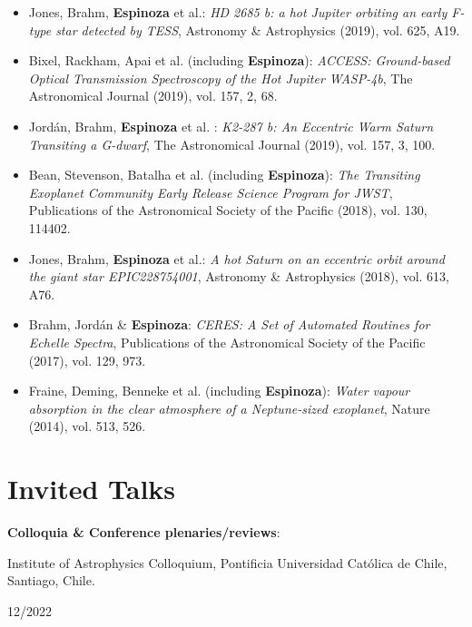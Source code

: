 \documentclass[12pt, a4paper]{article} %
\begin{document}
\begin{flushleft}
\begin{itemize}
\item Jones, Brahm, \textbf{Espinoza} et al.: \textit{HD 2685 b: a hot Jupiter orbiting an early F-type star detected by TESS}, Astronomy \& Astrophysics (2019), vol. 625, A19.
\item Bixel, Rackham, Apai et al. (including \textbf{Espinoza}): \textit{ACCESS: Ground-based Optical Transmission Spectroscopy of the Hot Jupiter WASP-4b}, The Astronomical Journal (2019), vol. 157, 2, 68.
\item Jord\'an, Brahm, \textbf{Espinoza} et al. : \textit{K2-287 b: An Eccentric Warm Saturn Transiting a G-dwarf}, The Astronomical Journal (2019), vol. 157, 3, 100.
\item Bean, Stevenson, Batalha et al. (including \textbf{Espinoza}): \textit{The Transiting Exoplanet Community Early Release Science Program for JWST}, Publications of the Astronomical Society of the Pacific (2018), vol. 130, 114402.
\item Jones, Brahm, \textbf{Espinoza} et al.: \textit{A hot Saturn on an eccentric orbit around the giant star EPIC228754001},  Astronomy \& Astrophysics (2018), vol. 613, A76.
\item Brahm, Jord\'an \& \textbf{Espinoza}: \textit{CERES: A Set of Automated Routines for Echelle Spectra}, Publications of the 
Astronomical Society of the Pacific (2017), vol. 129, 973.
\item Fraine, Deming, Benneke et al. (including \textbf{Espinoza}): \textit{Water vapour absorption in the clear atmosphere of a Neptune-sized exoplanet}, Nature (2014), vol. 513, 526.
\end{itemize}
\end{flushleft}



\section*{Invited Talks}

\textbf{Colloquia \& Conference plenaries/reviews}:\\

\begin{minipage}[t]{0.7\textwidth}
\begin{flushleft}%
  \setlength{\leftskip}{0.2cm}%
Institute of Astrophysics Colloquium, Pontificia Universidad Cat\'olica de Chile, Santiago, Chile.
\end{flushleft}
\end{minipage}
\begin{minipage}[t]{0.3\textwidth}
\hfill 12/2022
\end{minipage}
\vspace{0.2cm}
\end{document}
